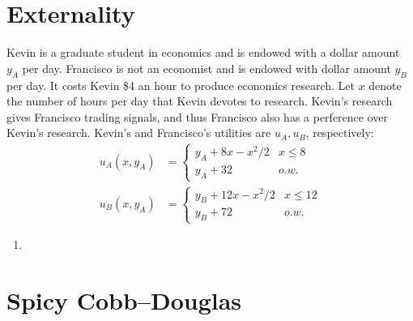 \documentclass[11pt]{article}
\begin{document}
\section{Externality}
Kevin is a graduate student in economics and 
is endowed with a dollar amount $y_A$ per day.
    Francisco is not an economist and is endowed with dollar amount $y_B$ per
    day. It costs Kevin \$4 an hour to produce economics research. Let $x$
    denote the number of hours per day that Kevin devotes to research. Kevin's research gives Francisco trading signals, and thus Francisco also has a perference over Kevin's research. Kevin's and Francisco's utilities are $u_A, u_B$, respectively:\begin{align*}
    u_A(x, y_A) &= \begin{cases}
        y_A + 8x - x^2/2 & x \le 8 \\
        y_A + 32 & o.w.
    \end{cases} \\
    u_B(x, y_A) &= \begin{cases}
        y_B + 12x - x^2/2 & x \le 12 \\
        y_B + 72 & o.w.
    \end{cases}
    \end{align*}
    
\begin{enumerate}
    \item 
\end{enumerate}
\section{Spicy Cobb--Douglas}
\end{document}
